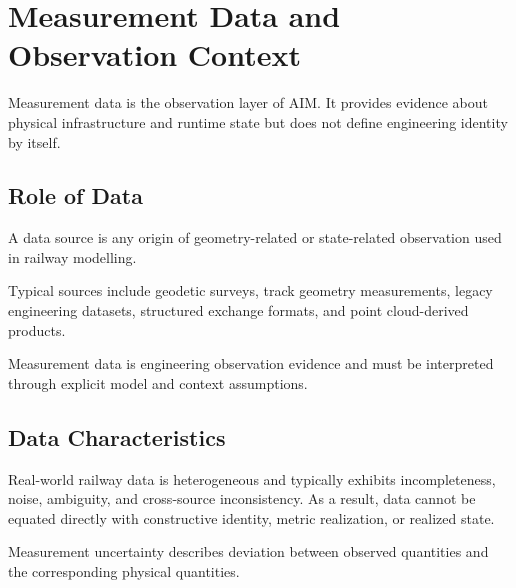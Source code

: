
\chapter{Measurement Data and Observation Context}

\label{chap:reality-data}


Measurement data is the observation layer of AIM. It provides evidence
about physical infrastructure and runtime state but does not define
engineering identity by itself.

\section{Role of Data}

\begin{definition}
A data source is any origin of geometry-related or state-related
observation used in railway modelling.
\end{definition}

Typical sources include geodetic surveys, track geometry measurements,
legacy engineering datasets, structured exchange formats, and point
cloud-derived products.

\begin{principle}
Measurement data is engineering observation evidence and must be
interpreted through explicit model and context assumptions.
\end{principle}

\section{Data Characteristics}

Real-world railway data is heterogeneous and typically exhibits
incompleteness, noise, ambiguity, and cross-source inconsistency. As a
result, data cannot be equated directly with constructive identity,
metric realization, or realized state.

\begin{definition}
Measurement uncertainty describes deviation between observed quantities
and the corresponding physical quantities.
\end{definition}


